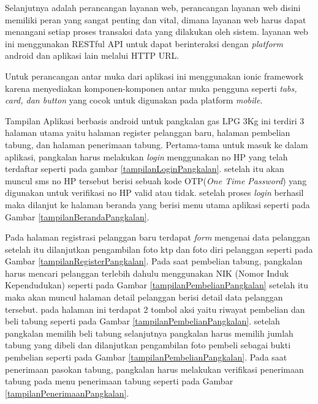 	\par Selanjutnya adalah perancangan layanan web, perancangan layanan web disini memiliki peran yang sangat penting dan vital, dimana layanan web harus dapat menangani setiap proses transaksi data yang dilakukan oleh sistem. layanan web ini menggunakan RESTful API untuk dapat berinteraksi dengan \textit{platform} android dan aplikasi lain melalui HTTP URL.
	
	\par Untuk perancangan antar muka dari aplikasi ini menggunakan ionic framework karena menyediakan komponen-komponen antar muka pengguna seperti \textit{tabs, card, dan button} yang cocok untuk digunakan pada platform \textit{mobile}.
	
	\par Tampilan Aplikasi berbasis android untuk pangkalan gas LPG 3Kg ini terdiri 3 halaman utama yaitu halaman register pelanggan baru, halaman pembelian tabung, dan halaman penerimaan tabung. Pertama-tama untuk masuk ke dalam aplikasi, pangkalan harus melakukan \textit{login} menggunakan no HP yang telah terdaftar seperti pada gambar \ref{tampilanLoginPangkalan}. setelah itu akan muncul sms no HP tersebut berisi sebuah kode OTP(\textit{One Time Password}) yang digunakan untuk verifikasi no HP valid atau tidak. setelah proses \textit{login} berhasil maka dilanjut ke halaman beranda yang berisi menu utama aplikasi seperti pada Gambar \ref{tampilanBerandaPangkalan}.
	\par Pada halaman registrasi pelanggan baru terdapat \textit{form} mengenai data pelanggan setelah itu dilanjutkan pengambilan foto ktp dan foto diri pelanggan seperti pada Gambar \ref{tampilanRegisterPangkalan}. Pada saat pembelian tabung, pangkalan harus mencari pelanggan terlebih dahulu menggunakan NIK (Nomor Induk Kependudukan) seperti pada Gambar \ref{tampilanPembelianPangkalan} setelah itu maka akan muncul halaman detail pelanggan berisi detail data pelanggan tersebut. pada halaman ini terdapat 2 tombol aksi yaitu riwayat pembelian dan beli tabung seperti pada Gambar \ref{tampilanPembelianPangkalan}. setelah pangkalan memilih beli tabung selanjutnya pangkalan harus memilih jumlah tabung yang dibeli dan dilanjutkan pengambilan foto pembeli sebagai bukti pembelian seperti pada Gambar \ref{tampilanPembelianPangkalan}. Pada saat penerimaan pasokan tabung, pangkalan harus melakukan verifikasi penerimaan tabung pada menu penerimaan tabung seperti pada Gambar \ref{tampilanPenerimaanPangkalan}.
	
